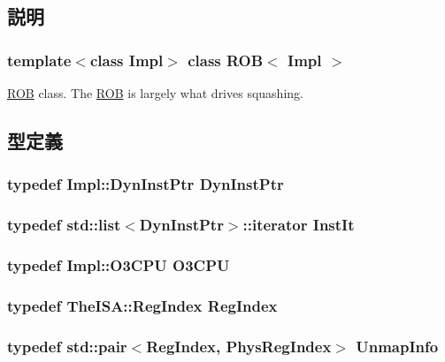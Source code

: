 \subsection{説明}
\subsubsection*{template$<$class Impl$>$ class ROB$<$ Impl $>$}

\hyperlink{classROB}{ROB} class. The \hyperlink{classROB}{ROB} is largely what drives squashing. 

\subsection{型定義}
\hypertarget{classROB_a028ce10889c5f6450239d9e9a7347976}{
\subsubsection[{DynInstPtr}]{\setlength{\rightskip}{0pt plus 5cm}typedef Impl::DynInstPtr {\bf DynInstPtr}}}
\label{classROB_a028ce10889c5f6450239d9e9a7347976}
\hypertarget{classROB_a59263e64bd60700e053c0be08e7c93ab}{
\subsubsection[{InstIt}]{\setlength{\rightskip}{0pt plus 5cm}typedef {\bf std::list}$<${\bf DynInstPtr}$>$::iterator {\bf InstIt}}}
\label{classROB_a59263e64bd60700e053c0be08e7c93ab}
\hypertarget{classROB_a44622cf06940413482836cb62931ac3f}{
\subsubsection[{O3CPU}]{\setlength{\rightskip}{0pt plus 5cm}typedef Impl::O3CPU {\bf O3CPU}}}
\label{classROB_a44622cf06940413482836cb62931ac3f}
\hypertarget{classROB_a36d25e03e43fa3bb4c5482cbefe5e0fb}{
\subsubsection[{RegIndex}]{\setlength{\rightskip}{0pt plus 5cm}typedef TheISA::RegIndex {\bf RegIndex}}}
\label{classROB_a36d25e03e43fa3bb4c5482cbefe5e0fb}
\hypertarget{classROB_a2aae34ed2f277a882bed03a84e40fcab}{
\subsubsection[{UnmapInfo}]{\setlength{\rightskip}{0pt plus 5cm}typedef {\bf std::pair}$<${\bf RegIndex}, {\bf PhysRegIndex}$>$ {\bf UnmapInfo}}}
\label{classROB_a2aae34ed2f277a882bed03a84e40fcab}


